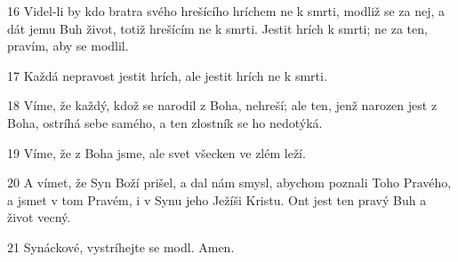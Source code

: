 \par 16 Videl-li by kdo bratra svého hrešícího hríchem ne k smrti, modliž se za nej, a dát jemu Buh život, totiž hrešícím ne k smrti. Jestit hrích k smrti; ne za ten, pravím, aby se modlil.
\par 17 Každá nepravost jestit hrích, ale jestit hrích ne k smrti.
\par 18 Víme, že každý, kdož se narodil z Boha, nehreší; ale ten, jenž narozen jest z Boha, ostríhá sebe samého, a ten zlostník se ho nedotýká.
\par 19 Víme, že z Boha jsme, ale svet všecken ve zlém leží.
\par 20 A vímet, že Syn Boží prišel, a dal nám smysl, abychom poznali Toho Pravého, a jsmet v tom Pravém, i v Synu jeho Ježíši Kristu. Ont jest ten pravý Buh a život vecný.
\par 21 Synáckové, vystríhejte se modl. Amen.


